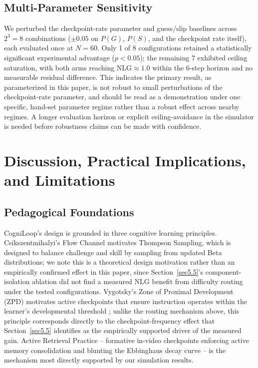 \documentclass[pdflatex,sn-apa]{sn-jnl}
\begin{document}
\subsection{Multi-Parameter Sensitivity}\label{sec5.7}

We perturbed the checkpoint-rate parameter and guess/slip baselines across $2^3=8$ combinations ($\pm0.05$ on $P(G)$, $P(S)$, and the checkpoint rate itself), each evaluated once at $N=60$. Only 1 of 8 configurations retained a statistically significant experimental advantage ($p<0.05$); the remaining 7 exhibited ceiling saturation, with both arms reaching $\text{NLG} \approx 1.0$ within the 6-step horizon and no measurable residual difference. This indicates the primary result, as parameterized in this paper, is not robust to small perturbations of the checkpoint-rate parameter, and should be read as a demonstration under one specific, hand-set parameter regime rather than a robust effect across nearby regimes. A longer evaluation horizon or explicit ceiling-avoidance in the simulator is needed before robustness claims can be made with confidence.

\section{Discussion, Practical Implications, and Limitations}\label{sec6}

\subsection{Pedagogical Foundations}\label{sec6.1}

CogniLoop's design is grounded in three cognitive learning principles. Csikszentmihalyi's Flow Channel motivates Thompson Sampling, which is designed to balance challenge and skill by sampling from updated Beta distributions; we note this is a theoretical design motivation rather than an empirically confirmed effect in this paper, since Section~\ref{sec5.5}'s component-isolation ablation did not find a measured NLG benefit from difficulty routing under the tested configurations. Vygotsky's Zone of Proximal Development (ZPD) motivates active checkpoints that ensure instruction operates within the learner's developmental threshold \citep{bloom19842}; unlike the routing mechanism above, this principle corresponds directly to the checkpoint-frequency effect that Section~\ref{sec5.5} identifies as the empirically supported driver of the measured gain. Active Retrieval Practice -- formative in-video checkpoints enforcing active memory consolidation and blunting the Ebbinghaus decay curve \citep{karpicke2008critical} -- is the mechanism most directly supported by our simulation results.
\end{document}
